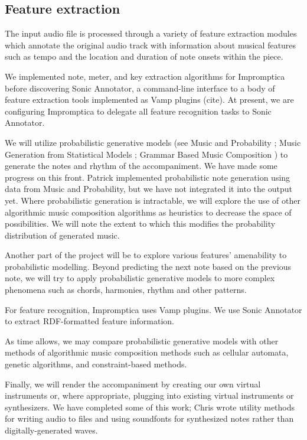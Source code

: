 \documentclass[11pt,conference,letterpaper]{IEEEtran}
\begin{document}
\subsection{Feature extraction}

The input audio file is processed through a variety of feature extraction modules which annotate the original audio track with information about musical features such as tempo and the location and duration of note onsets within the piece.

We implemented note, meter, and key extraction algorithms for Impromptica before discovering Sonic Annotator, a command-line interface to a body of feature extraction tools implemented as Vamp plugins (cite). At present, we are configuring Impromptica to delegate all feature recognition tasks to Sonic Annotator.

We will utilize probabilistic generative models (see Music and Probability \cite{temperly2007mprob}; Music Generation from Statistical Models \cite{conklin2003music}; Grammar Based Music Composition \cite{mccormack1996grammar}) to generate the notes and rhythm of the accompaniment. We have made some progress on this front. Patrick implemented probabilistic note generation using data from Music and Probability, but we have not integrated it into the output yet. Where probabilistic generation is intractable, we will explore the use of other algorithmic music composition algorithms as heuristics to decrease the space of possibilities. We will note the extent to which this modifies the probability distribution of generated music.

Another part of the project will be to explore various features’ amenability to probabilistic modelling. Beyond predicting the next note based on the previous note, we will try to apply probabilistic generative models to more complex phenomena such as chords, harmonies, rhythm and other patterns.

For feature recognition, Impromptica uses Vamp plugins. We use Sonic Annotator to extract RDF-formatted feature information.

As time allows, we may compare probabilistic generative models with other methods of algorithmic music composition methods such as cellular automata, genetic algorithms, and constraint-based methods.

Finally, we will render the accompaniment by creating our own virtual instruments or, where appropriate, plugging into existing virtual instruments or synthesizers. We have completed some of this work; Chris wrote utility methods for writing audio to files and using soundfonts for synthesized notes  rather than digitally-generated waves.
\end{document}
